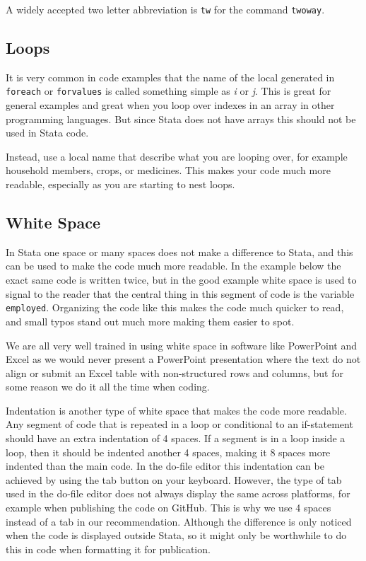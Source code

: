 A widely accepted two letter abbreviation is \verb|tw| for the command \verb|twoway|.

\subsection{Loops}

It is very common in code examples that the name of the local generated in \verb|foreach| or \verb|forvalues| 
is called something simple as \textit{i} or \textit{j}. This is great for general examples and great when you 
loop over indexes in an array in other programming languages. But since Stata does not have arrays this should 
not be used in Stata code.

Instead, use a local name that describe what you are looping over, for example household members, crops, or 
medicines. This makes your code much more readable, especially as you are starting to nest loops.


\subsection{White Space}

In Stata one space or many spaces does not make a difference to Stata, and this can be used to make the code 
much more readable. In the example below the exact same code is written twice, but in the good example white 
space is used to signal to the reader that the central thing in this segment of code is the variable 
\verb|employed|. Organizing the code like this makes the code much quicker to read, and small typos 
stand out much more making them easier to spot.

We are all very well trained in using white space in software like PowerPoint and Excel as we would never 
present a PowerPoint presentation where the text do not align or submit an Excel table with non-structured 
rows and columns, but for some reason we do it all the time when coding.


Indentation is another type of white space that makes the code more readable. Any segment of code that is 
repeated in a loop or conditional to an if-statement should have an extra indentation of 4 spaces. If a 
segment is in a loop inside a loop, then it should be indented another 4 spaces, making it 8 spaces more 
indented than the main code. In the do-file editor this indentation can be achieved by using the tab button on 
your keyboard. However, the type of tab used in the do-file editor does not always display the same across 
platforms, for example when publishing the code on GitHub. This is why we use 4 spaces instead of a tab in our 
recommendation. Although the difference is only noticed when the code is displayed outside Stata, so it might 
only be worthwhile to do this in code when formatting it for publication. 

